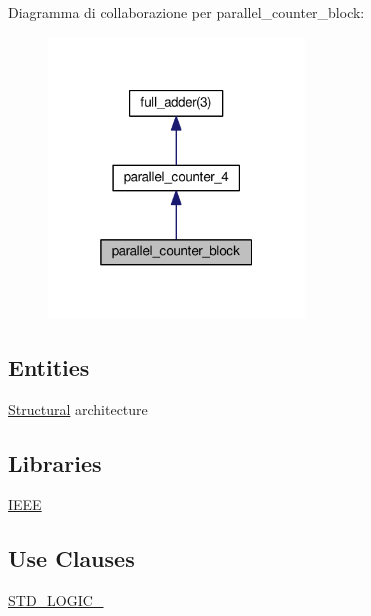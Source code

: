 Diagramma di collaborazione per parallel\+\_\+counter\+\_\+block\+:\nopagebreak
\begin{figure}[H]
\begin{center}
\leavevmode
\includegraphics[width=193pt]{classparallel__counter__block__coll__graph}
\end{center}
\end{figure}
\subsection*{Entities}
\begin{DoxyCompactItemize}
\item 
\hyperlink{classparallel__counter__block_1_1_structural}{Structural} architecture
\end{DoxyCompactItemize}
\subsection*{Libraries}
 \begin{DoxyCompactItemize}
\item 
\hypertarget{classparallel__counter__block_gae4f03c286607f3181e16b9aa12d0c6d4}{\hyperlink{group___majority_voter_gae4f03c286607f3181e16b9aa12d0c6d4}{I\+E\+E\+E} }\label{classparallel__counter__block_gae4f03c286607f3181e16b9aa12d0c6d4}

\end{DoxyCompactItemize}
\subsection*{Use Clauses}
 \begin{DoxyCompactItemize}
\item 
\hypertarget{classparallel__counter__block_gaa4b2b25246a821511120e3149b003563}{\hyperlink{group___majority_voter_gaa4b2b25246a821511120e3149b003563}{S\+T\+D\+\_\+\+L\+O\+G\+I\+C\+\_}   }\label{classparallel__counter__block_gaa4b2b25246a821511120e3149b003563}

\end{DoxyCompactItemize}
